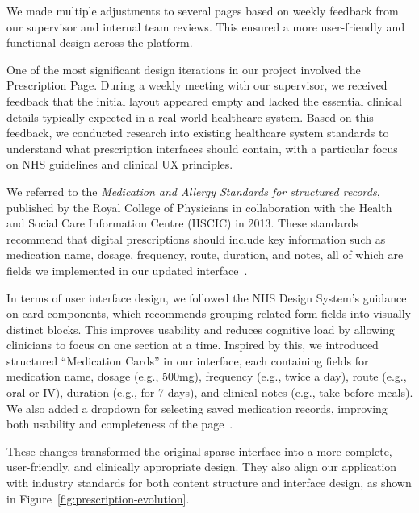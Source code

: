 We made multiple adjustments to several pages based on weekly feedback from our supervisor and internal team reviews. This ensured a more user-friendly and functional design across the platform.

One of the most significant design iterations in our project involved the Prescription Page. During a weekly meeting with our supervisor, we received feedback that the initial layout appeared empty and lacked the essential clinical details typically expected in a real-world healthcare system. Based on this feedback, we conducted research into existing healthcare system standards to understand what prescription interfaces should contain, with a particular focus on NHS guidelines and clinical UX principles.

We referred to the \emph{Medication and Allergy Standards for structured records}, published by the Royal College of Physicians in collaboration with the Health and Social Care Information Centre (HSCIC) in 2013. These standards recommend that digital prescriptions should include key information such as medication name, dosage, frequency, route, duration, and notes, all of which are fields we implemented in our updated interface~\cite{rcp_med_standards}.

In terms of user interface design, we followed the NHS Design System’s guidance on card components, which recommends grouping related form fields into visually distinct blocks. This improves usability and reduces cognitive load by allowing clinicians to focus on one section at a time. Inspired by this, we introduced structured “Medication Cards” in our interface, each containing fields for medication name, dosage (e.g., 500mg), frequency (e.g., twice a day), route (e.g., oral or IV), duration (e.g., for 7 days), and clinical notes (e.g., take before meals). We also added a dropdown for selecting saved medication records, improving both usability and completeness of the page~\cite{nhs_design_system}.

These changes transformed the original sparse interface into a more complete, user-friendly, and clinically appropriate design. They also align our application with industry standards for both content structure and interface design, as shown in Figure~{\ref{fig:prescription-evolution}}.

